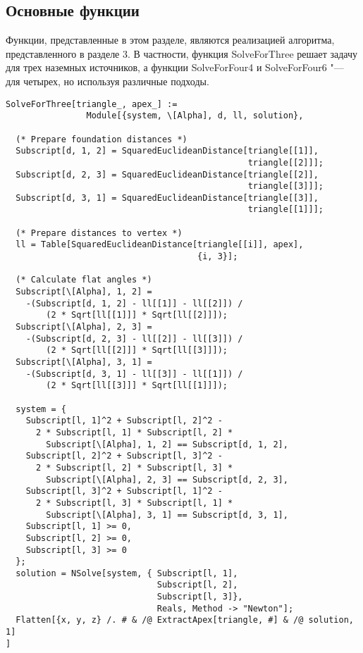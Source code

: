 \documentclass[../main.tex]{subfiles}
\begin{document}
\subsection{Основные функции}
Функции, представленные в этом разделе, являются реализацией алгоритма, представленного в разделе 3. В частности, функция {\ttfamily SolveForThree} решает задачу для трех наземных источников, а функции {\ttfamily SolveForFour4} и {\ttfamily SolveForFour6} "--- для четырех, но используя различные подходы.

\begin{lstlisting}
SolveForThree[triangle_, apex_] :=
                Module[{system, \[Alpha], d, ll, solution},

  (* Prepare foundation distances *)
  Subscript[d, 1, 2] = SquaredEuclideanDistance[triangle[[1]],
                                                triangle[[2]]];
  Subscript[d, 2, 3] = SquaredEuclideanDistance[triangle[[2]],
                                                triangle[[3]]];
  Subscript[d, 3, 1] = SquaredEuclideanDistance[triangle[[3]],
                                                triangle[[1]]];

  (* Prepare distances to vertex *)
  ll = Table[SquaredEuclideanDistance[triangle[[i]], apex],
                                      {i, 3}];

  (* Calculate flat angles *)
  Subscript[\[Alpha], 1, 2] =
    -(Subscript[d, 1, 2] - ll[[1]] - ll[[2]]) /
        (2 * Sqrt[ll[[1]]] * Sqrt[ll[[2]]]);
  Subscript[\[Alpha], 2, 3] =
    -(Subscript[d, 2, 3] - ll[[2]] - ll[[3]]) /
        (2 * Sqrt[ll[[2]]] * Sqrt[ll[[3]]]);
  Subscript[\[Alpha], 3, 1] =
    -(Subscript[d, 3, 1] - ll[[3]] - ll[[1]]) /
        (2 * Sqrt[ll[[3]]] * Sqrt[ll[[1]]]);

  system = {
    Subscript[l, 1]^2 + Subscript[l, 2]^2 -
      2 * Subscript[l, 1] * Subscript[l, 2] *
        Subscript[\[Alpha], 1, 2] == Subscript[d, 1, 2],
    Subscript[l, 2]^2 + Subscript[l, 3]^2 -
      2 * Subscript[l, 2] * Subscript[l, 3] *
        Subscript[\[Alpha], 2, 3] == Subscript[d, 2, 3],
    Subscript[l, 3]^2 + Subscript[l, 1]^2 -
      2 * Subscript[l, 3] * Subscript[l, 1] *
        Subscript[\[Alpha], 3, 1] == Subscript[d, 3, 1],
    Subscript[l, 1] >= 0,
    Subscript[l, 2] >= 0,
    Subscript[l, 3] >= 0
  };
  solution = NSolve[system, { Subscript[l, 1],
                              Subscript[l, 2],
                              Subscript[l, 3]},
                              Reals, Method -> "Newton"];
  Flatten[{x, y, z} /. # & /@ ExtractApex[triangle, #] & /@ solution, 1]
]


\end{lstlisting}
\end{document}
